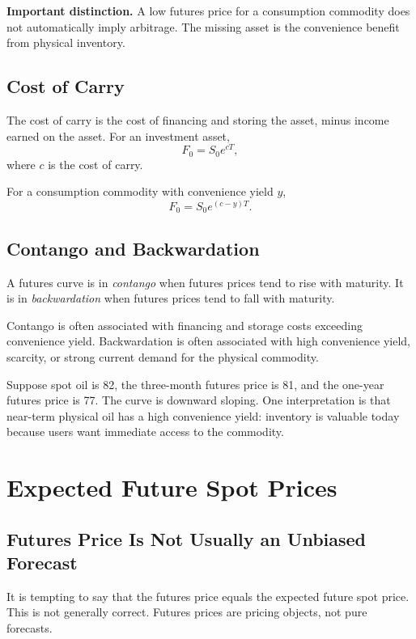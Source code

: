 \begin{boxF}
\textbf{Important distinction.} A low futures price for a consumption commodity
does not automatically imply arbitrage. The missing asset is the convenience
benefit from physical inventory.
\end{boxF}

\subsection{Cost of Carry}

The cost of carry is the cost of financing and storing the asset, minus income
earned on the asset. For an investment asset,
\[
    F_0=S_0e^{cT},
\]
where $c$ is the cost of carry.

For a consumption commodity with convenience yield $y$,
\[
    F_0=S_0e^{(c-y)T}.
\]

\subsection{Contango and Backwardation}

A futures curve is in \emph{contango} when futures prices tend to rise with
maturity. It is in \emph{backwardation} when futures prices tend to fall with
maturity.

Contango is often associated with financing and storage costs exceeding
convenience yield. Backwardation is often associated with high convenience yield,
scarcity, or strong current demand for the physical commodity.

\begin{exmp}
Suppose spot oil is 82, the three-month futures price is 81, and the one-year
futures price is 77. The curve is downward sloping. One interpretation is that
near-term physical oil has a high convenience yield: inventory is valuable today
because users want immediate access to the commodity.
\end{exmp}

\section{Expected Future Spot Prices}

\subsection{Futures Price Is Not Usually an Unbiased Forecast}

It is tempting to say that the futures price equals the expected future spot
price. This is not generally correct. Futures prices are pricing objects, not
pure forecasts.

